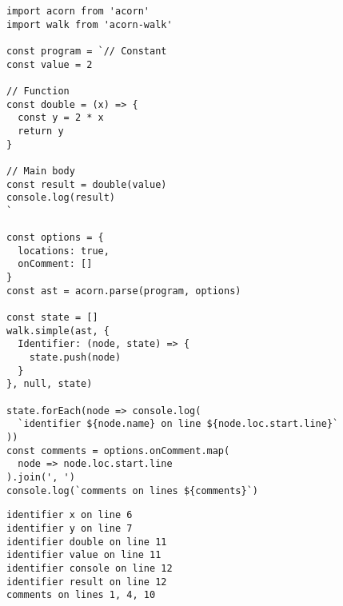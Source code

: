 \documentclass[krantzl]{krantz}
\begin{document}
\begin{lstlisting}[frame=tblr]
import acorn from 'acorn'
import walk from 'acorn-walk'

const program = `// Constant
const value = 2

// Function
const double = (x) => {
  const y = 2 * x
  return y
}

// Main body
const result = double(value)
console.log(result)
`

const options = {
  locations: true,
  onComment: []
}
const ast = acorn.parse(program, options)

const state = []
walk.simple(ast, {
  Identifier: (node, state) => {
    state.push(node)
  }
}, null, state)

state.forEach(node => console.log(
  `identifier ${node.name} on line ${node.loc.start.line}`
))
const comments = options.onComment.map(
  node => node.loc.start.line
).join(', ')
console.log(`comments on lines ${comments}`)
\end{lstlisting}



\begin{lstlisting}[frame=tblr,backgroundcolor=\color{black!5}]
identifier x on line 6
identifier y on line 7
identifier double on line 11
identifier value on line 11
identifier console on line 12
identifier result on line 12
comments on lines 1, 4, 10
\end{lstlisting}
\end{document}
